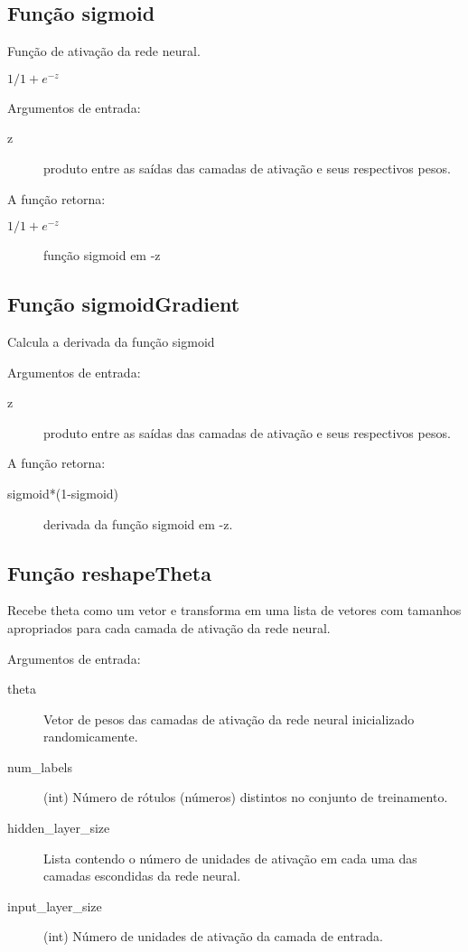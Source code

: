 \documentclass[12pt]{article}
\begin{document}
\subsection{Função sigmoid}
Função de ativação da rede neural.

$1/1+e^{-z}$

Argumentos de entrada:
\begin{description}
\item[z] produto entre as saídas das camadas de ativação e seus respectivos pesos. 
\end{description}

A função retorna:
\begin{description}
\item[$1/1+e^{-z}$] função sigmoid em -z
\end{description}

\subsection{Função sigmoidGradient}
Calcula a derivada da função sigmoid

Argumentos de entrada:
\begin{description}

\item[z] produto entre as saídas das camadas de ativação e seus respectivos pesos. 
\end{description}

A função retorna:
\begin{description}
\item[sigmoid*(1-sigmoid)] derivada da função sigmoid em -z.
\end{description}

\subsection{Função reshapeTheta}
Recebe theta como um vetor e transforma em uma lista de vetores com tamanhos apropriados para cada camada de ativação da rede neural.

Argumentos de entrada:
\begin{description}
\item[theta] Vetor de pesos das camadas de ativação da rede neural inicializado randomicamente.
\item[num\_labels] (int) Número de rótulos (números) distintos no conjunto de treinamento.
\item[hidden\_layer\_size] Lista contendo o número de unidades de ativação em cada uma das camadas escondidas da rede neural.
\item[input\_layer\_size] (int) Número de unidades de ativação da camada de entrada.
\end{description}
\end{document}
